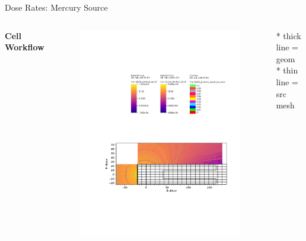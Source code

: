 \documentclass{beamer}
\begin{document}
\begin{frame}{Dose Rates: Mercury Source}
\begin{columns}[T]
        \textbf{Cell Workflow}
        \begin{figure}
                \centering
                \includegraphics[scale=0.49,trim={2.5cm 6cm 1cm 15cm},clip]{figs/dose_mer_cell_novoid.pdf}
        \end{figure}


	\tiny{* thick line = geom} \\
	\tiny{* thin line = src mesh}


\end{columns}
\end{frame}
\end{document}
